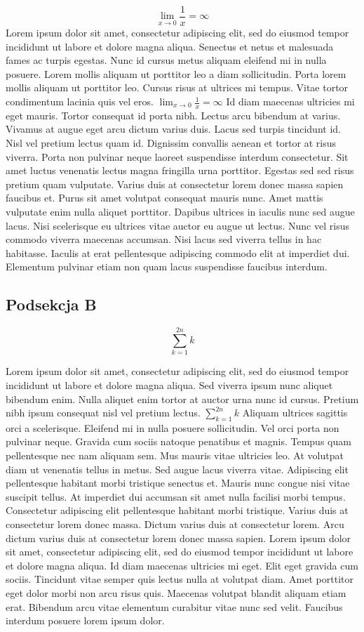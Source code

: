 \documentclass[12pt]{article}
\begin{document}
$$\lim_{x \to 0} \frac{1}{x} = \infty $$
Lorem ipsum dolor sit amet, consectetur adipiscing elit, sed do eiusmod tempor incididunt ut labore et dolore magna aliqua. Senectus et netus et malesuada fames ac turpis egestas. Nunc id cursus metus aliquam eleifend mi in nulla posuere. Lorem mollis aliquam ut porttitor leo a diam sollicitudin. Porta lorem mollis aliquam ut porttitor leo. Cursus risus at ultrices mi tempus. Vitae tortor condimentum lacinia quis vel eros. $\lim_{x \to 0} \frac{1}{x} = \infty $ Id diam maecenas ultricies mi eget mauris. Tortor consequat id porta nibh. Lectus arcu bibendum at varius. Vivamus at augue eget arcu dictum varius duis. Lacus sed turpis tincidunt id. Nisl vel pretium lectus quam id. Dignissim convallis aenean et tortor at risus viverra. Porta non pulvinar neque laoreet suspendisse interdum consectetur. Sit amet luctus venenatis lectus magna fringilla urna porttitor. Egestas sed sed risus pretium quam vulputate. Varius duis at consectetur lorem donec massa sapien faucibus et. Purus sit amet volutpat consequat mauris nunc. Amet mattis vulputate enim nulla aliquet porttitor. Dapibus ultrices in iaculis nunc sed augue lacus. Nisi scelerisque eu ultrices vitae auctor eu augue ut lectus. Nunc vel risus commodo viverra maecenas accumsan. Nisi lacus sed viverra tellus in hac habitasse. Iaculis at erat pellentesque adipiscing commodo elit at imperdiet dui. Elementum pulvinar etiam non quam lacus suspendisse faucibus interdum.


\subsection{Podsekcja B}
$$\sum_{k=1}^{2n} k $$

Lorem ipsum dolor sit amet, consectetur adipiscing elit, sed do eiusmod tempor incididunt ut labore et dolore magna aliqua. Sed viverra ipsum nunc aliquet bibendum enim. Nulla aliquet enim tortor at auctor urna nunc id cursus. Pretium nibh ipsum consequat nisl vel pretium lectus. $\sum_{k=1}^{2n} k $ Aliquam ultrices sagittis orci a scelerisque. Eleifend mi in nulla posuere sollicitudin. Vel orci porta non pulvinar neque. Gravida cum sociis natoque penatibus et magnis. Tempus quam pellentesque nec nam aliquam sem. Mus mauris vitae ultricies leo. At volutpat diam ut venenatis tellus in metus. Sed augue lacus viverra vitae. Adipiscing elit pellentesque habitant morbi tristique senectus et. Mauris nunc congue nisi vitae suscipit tellus. At imperdiet dui accumsan sit amet nulla facilisi morbi tempus. Consectetur adipiscing elit pellentesque habitant morbi tristique. Varius duis at consectetur lorem donec massa. Dictum varius duis at consectetur lorem. Arcu dictum varius duis at consectetur lorem donec massa sapien. Lorem ipsum dolor sit amet, consectetur adipiscing elit, sed do eiusmod tempor incididunt ut labore et dolore magna aliqua. Id diam maecenas ultricies mi eget. Elit eget gravida cum sociis. Tincidunt vitae semper quis lectus nulla at volutpat diam. Amet porttitor eget dolor morbi non arcu risus quis. Maecenas volutpat blandit aliquam etiam erat. Bibendum arcu vitae elementum curabitur vitae nunc sed velit. Faucibus interdum posuere lorem ipsum dolor.

\nocite{*}


\end{document}
